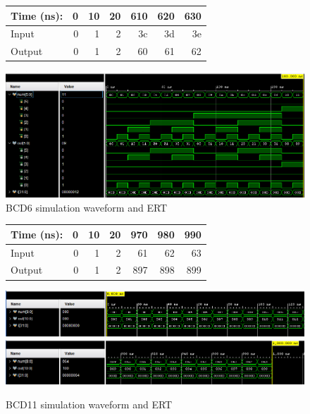\documentclass[11pt]{article}
\begin{document}
\begin{figure}[ht]\centering
	\begin{tabular}{l|rrrrrr}
		Time (ns): & 0 & 10 & 20 & 610 & 620 & 630 \\
		\midrule 
		Input & 0 & 1 & 2 & 3c & 3d & 3e \\
		Output & 0 & 1 & 2 & 60 & 61 & 62 \\
	\end{tabular}\medskip
	
	\includegraphics[width=1.0\textwidth]{Part2}
	\caption{BCD6 simulation waveform and ERT}
	\label{fig:sim_with_table}
\end{figure}

\begin{figure}[ht]\centering
	\begin{tabular}{l|rrrrrr}
		Time (ns): & 0 & 10 & 20 & 970 & 980 & 990 \\
		\midrule 
		Input & 0 & 1 & 2 & 61 & 62 & 63 \\
		Output & 0 & 1 & 2 & 897 & 898 & 899 \\
	\end{tabular}\medskip
	
	\includegraphics[width=1.0\textwidth]{11BitFirst}
	\includegraphics[width=1.0\textwidth]{11BitSecond}
	\caption{BCD11 simulation waveform and ERT}
	\label{fig:sim_with_table}
\end{figure}
\end{document}
